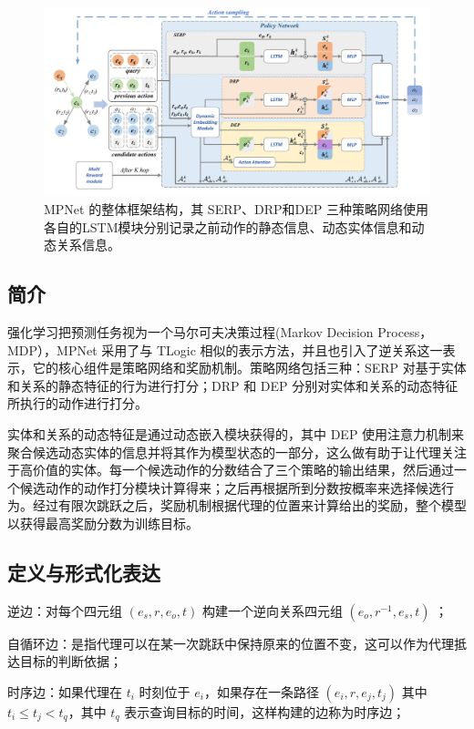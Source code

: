 \documentclass[a4paper, AutoFakeBold]{article}
\begin{document}
\begin{figure}
	\captionsetup{width=0.85\textwidth}
	\centering
	\includegraphics[width=1.0\textwidth]{figures/MPNet.png}
	\caption{MPNet 的整体框架结构，其 SERP、DRP和DEP 三种策略网络使用各自的LSTM模块分别记录之前动作的静态信息、动态实体信息和动态关系信息\cite{4-2024RefBlue}。}
\end{figure}



\subsection{简介}

强化学习把预测任务视为一个马尔可夫决策过程(Markov Decision Process，MDP），MPNet 采用了与 TLogic 相似的表示方法，并且也引入了逆关系这一表示，它的核心组件是策略网络和奖励机制。策略网络包括三种：SERP 对基于实体和关系的静态特征的行为进行打分；DRP 和 DEP 分别对实体和关系的动态特征所执行的动作进行打分。

实体和关系的动态特征是通过动态嵌入模块获得的，其中 DEP 使用注意力机制来聚合候选动态实体的信息并将其作为模型状态的一部分，这么做有助于让代理关注于高价值的实体。每一个候选动作的分数结合了三个策略的输出结果，然后通过一个候选动作的动作打分模块计算得来；之后再根据所到分数按概率来选择候选行为。经过有限次跳跃之后，奖励机制根据代理的位置来计算给出的奖励，整个模型以获得最高奖励分数为训练目标。


\subsection{定义与形式化表达}

逆边：对每个四元组 $(e_s,r,e_o,t)$ 构建一个逆向关系四元组 $(e_o,r^{-1},e_s,t)$ ；

自循环边：是指代理可以在某一次跳跃中保持原来的位置不变，这可以作为代理抵达目标的判断依据；

时序边：如果代理在 $t_i$ 时刻位于 $e_i$，如果存在一条路径 $(e_i,r,e_j,t_j)$ 其中 $t_i\le t_j<t_q$，其中 $t_q$ 表示查询目标的时间，这样构建的边称为时序边；
\end{document}
